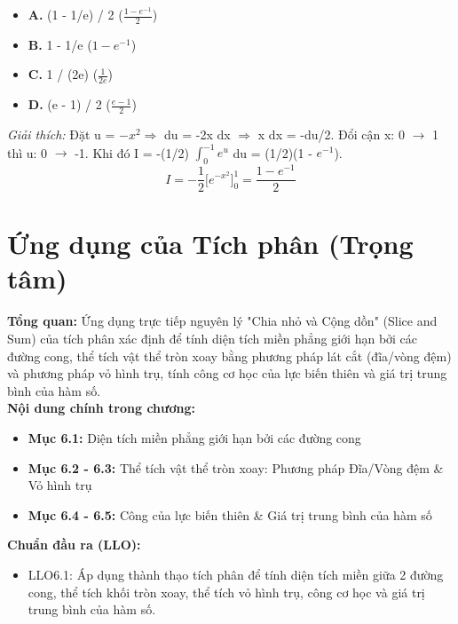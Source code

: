 \documentclass[11pt,a4paper,oneside]{book}
\begin{document}
\begin{enumerate}[label=\textbf{Câu \arabic*:}, leftmargin=2.2em, itemsep=8pt]
  \begin{itemize}[label={}, leftmargin=1em, itemsep=2pt]
    \item \textbf{A.} (1 - 1/e) / 2 \quad ($\frac{1 - e^{-1}}{2}$)
    \item \textbf{B.} 1 - 1/e \quad ($1 - e^{-1}$)
    \item \textbf{C.} 1 / (2e) \quad ($\frac{1}{2e}$)
    \item \textbf{D.} (e - 1) / 2 \quad ($\frac{e - 1}{2}$)
  \end{itemize}
  \vspace{2pt}
   \textit{Giải thích:} Đặt u = $-x^2 \Rightarrow$  du = -2x dx $\Rightarrow$  x dx = -du/2. Đổi cận x: 0 $\to$  1 thì u: 0 $\to$  -1. Khi đó I = -(1/2) $\int_0^{-1} e^u$ du = (1/2)(1 - $e^{-1}$).
  \[ I = -\frac{1}{2}\Big[e^{-x^2}\Big]_0^1 = \frac{1 - e^{-1}}{2} \]
\end{enumerate}

\chapter{Ứng dụng của Tích phân (Trọng tâm)}
\label{chap:chuong-6}

\begin{tcolorbox}[colback=slate!5!white,colframe=slate!75!black,title={\textbf{Mục lục Chương 6 \& Chuẩn đầu ra (Buổi 6)}}]
\textbf{Tổng quan:} Ứng dụng trực tiếp nguyên lý "Chia nhỏ và Cộng dồn" (Slice and Sum) của tích phân xác định để tính diện tích miền phẳng giới hạn bởi các đường cong, thể tích vật thể tròn xoay bằng phương pháp lát cắt (đĩa/vòng đệm) và phương pháp vỏ hình trụ, tính công cơ học của lực biến thiên và giá trị trung bình của hàm số.\\[6pt]
\textbf{Nội dung chính trong chương:}
\begin{itemize}[leftmargin=1.5em, itemsep=2pt]
  \item \textbf{Mục 6.1:} Diện tích miền phẳng giới hạn bởi các đường cong
  \item \textbf{Mục 6.2 - 6.3:} Thể tích vật thể tròn xoay: Phương pháp Đĩa/Vòng đệm \& Vỏ hình trụ
  \item \textbf{Mục 6.4 - 6.5:} Công của lực biến thiên \& Giá trị trung bình của hàm số
\end{itemize}
\textbf{Chuẩn đầu ra (LLO):}
\begin{itemize}[leftmargin=1.5em, itemsep=2pt]
  \item LLO6.1: Áp dụng thành thạo tích phân để tính diện tích miền giữa 2 đường cong, thể tích khối tròn xoay, thể tích vỏ hình trụ, công cơ học và giá trị trung bình của hàm số.
\end{itemize}
\end{tcolorbox}
\end{document}

